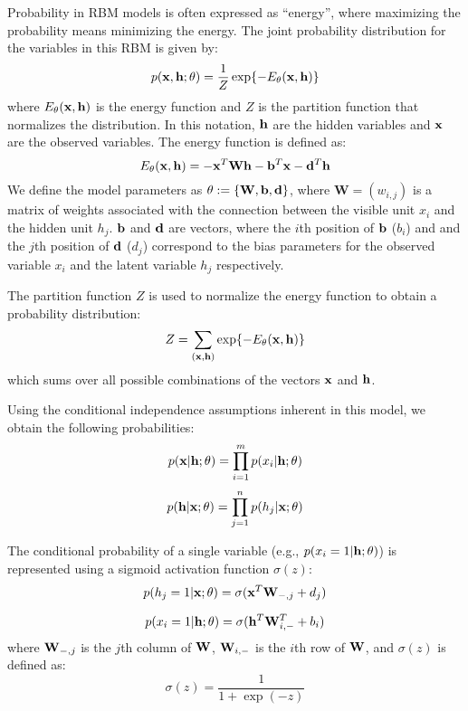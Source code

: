 \documentclass[11pt]{article}
\newcommand{\vx}{{\bf x}}
\newcommand{\vh}{{\bf h}}
\newcommand{\vb}{{\bf b}}
\newcommand{\vd}{{\bf d}}
\newcommand{\W}{{\bf W}}
\begin{document}
Probability in RBM models is often expressed as ``energy'', where maximizing the probability means minimizing the energy. The joint probability
distribution for the variables in this RBM is given by:
\begin{equation}
\label{eq:joint}
p(\vx, \vh;\theta) = \frac{1}{Z} \exp\{-E_\theta(\vx, \vh)\}
\end{equation}
where $E_\theta(\vx, \vh)$ is the energy function and $Z$ is the partition function that normalizes the distribution. In this notation, $\vh$ are the hidden variables and $\vx$ are the observed variables. The energy function is defined as:
\begin{equation}
E_\theta(\vx, \vh) = -\vx^T \mathbf{W}\vh - \vb^T\vx - \vd^T\vh
\end{equation}
We define the model parameters as $\theta:=\{\W,\vb,\vd\}$, where $\mathbf{W} = (w_{i,j})$ is a matrix of weights associated with the connection between the visible unit $x_i$ and the hidden unit $h_j$.
$\vb$ and $\vd$ are vectors, where the $i$th position of $\vb$ ($b_i$) and and the $j$th position of $\vd$ ($d_j$) correspond
to the bias parameters for the observed variable $x_i$ and the latent variable $h_j$  respectively.

The partition function $Z$ is used to normalize the energy function to obtain a probability distribution:
\begin{equation}
Z = \sum_{(\vx,\vh)} \exp\{-E_\theta(\vx, \vh)\}
\end{equation}
which sums over all possible combinations of the vectors $\vx$ and $\vh$.

Using the conditional independence assumptions inherent in this model, we obtain the following probabilities:
\begin{equation}
p(\vx|\vh;\theta) = \prod_{i=1}^{m} p(x_i|\vh;\theta)
\end{equation}
\begin{equation}
\label{eq:cond}
p(\vh|\vx;\theta) = \prod_{j=1}^{n} p(h_j|\vx;\theta)
\end{equation}

The conditional probability of a single variable (e.g., $p(x_i=1|\vh;\theta)$) is represented using a sigmoid activation function $\sigma(z)$:
\begin{equation}
\label{eq:phx}
p(h_j=1|\vx;\theta) = \sigma(\vx^T\W_{-,j} + d_j)
\end{equation}

\begin{equation}
\label{eq:pxh}
p(x_i=1|\vh;\theta) = \sigma(\vh^T\W_{i,-}^T + b_i)
\end{equation}
where $\W_{-,j}$ is the $j$th column of $\W$, $\W_{i,-}$ is the $i$th row of $\W$, and $\sigma(z)$ is defined as:
\begin{equation}
\sigma(z) = \frac{1}{1+\exp(-z)}
\end{equation}
\end{document}
